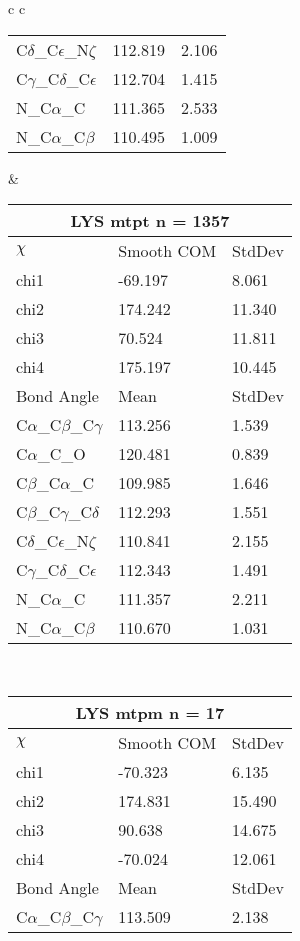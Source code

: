 \begin{longtable}{ c c }
\begin{tabular}{ l l l }
  C$\delta$\_C$\epsilon$\_N$\zeta$ & 112.819 & 2.106\\
  C$\gamma$\_C$\delta$\_C$\epsilon$ & 112.704 & 1.415\\
  N\_C$\alpha$\_C & 111.365 & 2.533\\
  N\_C$\alpha$\_C$\beta$ & 110.495 & 1.009\\
  \bottomrule
  \end{tabular}
  &
  \begin{tabular}{ l l l }
  \toprule
  \multicolumn{3}{c}{LYS \textbf{mtpt} n = 1357} \\ \toprule
  $\chi$       & Smooth COM & StdDev \\ \midrule
  chi1 & -69.197 & 8.061 \\ 
  chi2 & 174.242 & 11.340 \\ 
  chi3 & 70.524 & 11.811 \\ 
  chi4 & 175.197 & 10.445 \\ \midrule
  Bond Angle   & Mean     & StdDev \\ \midrule
  C$\alpha$\_C$\beta$\_C$\gamma$ & 113.256 & 1.539\\
  C$\alpha$\_C\_O & 120.481 & 0.839\\
  C$\beta$\_C$\alpha$\_C & 109.985 & 1.646\\
  C$\beta$\_C$\gamma$\_C$\delta$ & 112.293 & 1.551\\
  C$\delta$\_C$\epsilon$\_N$\zeta$ & 110.841 & 2.155\\
  C$\gamma$\_C$\delta$\_C$\epsilon$ & 112.343 & 1.491\\
  N\_C$\alpha$\_C & 111.357 & 2.211\\
  N\_C$\alpha$\_C$\beta$ & 110.670 & 1.031\\
  \bottomrule
  \end{tabular}
  \\
  \begin{tabular}{ l l l }
  \toprule
  \multicolumn{3}{c}{LYS \textbf{mtpm} n = 17} \\ \toprule
  $\chi$       & Smooth COM & StdDev \\ \midrule
  chi1 & -70.323 & 6.135 \\ 
  chi2 & 174.831 & 15.490 \\ 
  chi3 & 90.638 & 14.675 \\ 
  chi4 & -70.024 & 12.061 \\ \midrule
  Bond Angle   & Mean     & StdDev \\ \midrule
  C$\alpha$\_C$\beta$\_C$\gamma$ & 113.509 & 2.138\\

\end{tabular}
\end{longtable}
